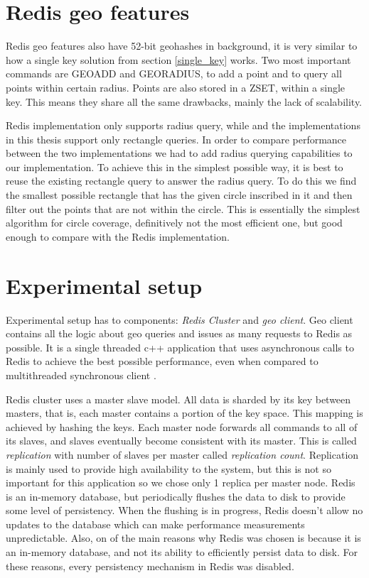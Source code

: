 \documentclass[times, utf8, diplomski]{fer}
\begin{document}
\section {Redis geo features} \label{redis_geo}
Redis geo features also have 52-bit geohashes in background, it is very similar to how a single key solution from section \ref{single_key} works. Two most important commands are GEOADD and GEORADIUS, to add a point and to query all points within certain radius. Points are also stored in a ZSET, within a single key. This means they share all the same drawbacks, mainly the lack of scalability.

Redis implementation only supports radius query, while and the implementations in this thesis support only rectangle queries. In order to compare performance between the two implementations we had to add radius querying capabilities to our implementation. To achieve this in the simplest possible way, it is best to reuse the existing rectangle query to answer the radius query. To do this we find the smallest possible rectangle that has the given circle inscribed in it and then filter out the points that are not within the circle. This is essentially the simplest algorithm for circle coverage, definitively not the most efficient one, but good enough to compare with the Redis implementation.

\section {Experimental setup} \label{setup}
Experimental setup has to components: \emph{Redis Cluster} and \emph{geo client}. Geo client contains all the logic about geo queries and issues as many requests to Redis as possible. It is a single threaded c++ application that uses asynchronous calls to Redis to achieve the best possible performance, even when compared to multithreaded synchronous client \cite{clientperf}.

Redis cluster uses a master slave model. All data is sharded by its key between masters, that is, each master contains a portion of the key space. This mapping is achieved by hashing the keys. Each master node forwards all commands to all of its slaves, and slaves eventually become consistent with its master. This is called \emph{replication} with number of slaves per master called \emph{replication count}. Replication is mainly used to provide high availability to the system, but this is not so important for this application so we chose only 1 replica per master node.
Redis is an in-memory database, but periodically flushes the data to disk to provide some level of persistency. When the flushing is in progress, Redis doesn't allow no updates to the database which can make performance measurements unpredictable. Also, on of the main reasons why Redis was chosen is because it is an in-memory database, and not its ability to efficiently persist data to disk. For these reasons, every persistency mechanism in Redis was disabled.
\end{document}
